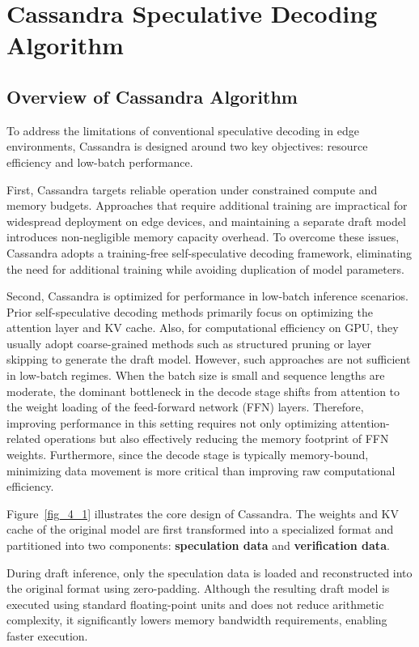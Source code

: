 \section{Cassandra Speculative Decoding Algorithm}
\label{section_4}

\subsection{Overview of Cassandra Algorithm}
\label{section_4_1}
To address the limitations of conventional speculative decoding in edge environments, Cassandra is designed around two key objectives: resource efficiency and low-batch performance.

First, Cassandra targets reliable operation under constrained compute and memory budgets. Approaches that require additional training are impractical for widespread deployment on edge devices, and maintaining a separate draft model introduces non-negligible memory capacity overhead. To overcome these issues, Cassandra adopts a training-free self-speculative decoding framework, eliminating the need for additional training while avoiding duplication of model parameters.

Second, Cassandra is optimized for performance in low-batch inference scenarios. Prior self-speculative decoding methods primarily focus on optimizing the attention layer and KV cache. Also, for computational efficiency on GPU, they usually adopt coarse-grained methods such as structured pruning or layer skipping to generate the draft model. However, such approaches are not sufficient in low-batch regimes. When the batch size is small and sequence lengths are moderate, the dominant bottleneck in the decode stage shifts from attention to the weight loading of the feed-forward network (FFN) layers. Therefore, improving performance in this setting requires not only optimizing attention-related operations but also effectively reducing the memory footprint of FFN weights. Furthermore, since the decode stage is typically memory-bound, minimizing data movement is more critical than improving raw computational efficiency.

Figure~\ref{fig_4_1} illustrates the core design of Cassandra. The weights and KV cache of the original model are first transformed into a specialized format and partitioned into two components: \textbf{speculation data} and \textbf{verification data}.

During draft inference, only the speculation data is loaded and reconstructed into the original format using zero-padding. Although the resulting draft model is executed using standard floating-point units and does not reduce arithmetic complexity, it significantly lowers memory bandwidth requirements, enabling faster execution.

